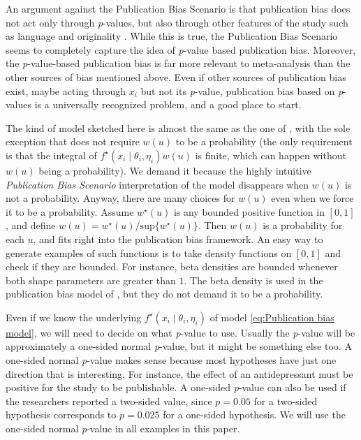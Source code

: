 \documentclass[preprint, authoryear]{elsarticle}
\theoremstyle{plain}
\theoremstyle{definition}
\begin{document}
An argument against the Publication Bias Scenario is that publication bias does not act only through \emph{p}-values, but also through other features of the study such as language \citep{egger1998meta}
and originality \citep{callaham1998positive}. While this is true, the Publication Bias Scenario seems to completely capture the idea of \emph{p}-value based publication bias. Moreover, the \emph{p}-value-based publication bias is far more relevant to meta-analysis than the other sources of bias mentioned above. Even if other sources of publication bias exist, maybe acting through $x_{i}$ but not its \emph{p}-value, publication bias based on \emph{p}-values is a universally recognized problem, and a good place to start.

The kind of model sketched here is almost the same as the one of \citet{hedges1992modeling}, with the sole exception that \citet{hedges1992modeling} does not require $w(u)$ to be a probability (the only requirement is that the integral of $f^{\star}\left(x_{i}\mid\theta_{i},\eta_{i}\right)w\left(u\right)$ is finite, which can happen without $w(u)$ being a probability). We demand it because the highly intuitive \emph{Publication Bias Scenario} interpretation of the model disappears when $w(u)$ is not a probability. Anyway, there are many choices for $w(u)$ even when we force it to be a probability. Assume $w^{\star}(u)$ is any bounded positive function in $\left[0,1\right]$, and define $w(u)=w^{\star}(u)/\textrm{sup}\{w^{\star}(u)\}$. Then $w\left(u\right)$ is a probability for each $u$, and fits right into the publication bias framework. An easy way to generate examples of such functions is to take density functions on $\left[0,1\right]$ and check if they are bounded. For instance, beta densities are bounded whenever both shape parameters are greater than $1$. The beta density is used in the publication bias model of \citet{citkowicz2017parsimonious}, but they do not demand it to be a probability.

Even if we know the underlying $f^{\star}\left(x_{i}\mid\theta_{i},\eta_{i}\right)$ of model \eqref{eq:Publication bias model}, we will need to decide on what \emph{p}-value to use. Usually the \emph{p}-value will be approximately a one-sided normal \emph{p}-value, but it might be something
else too. A one-sided normal \emph{p}-value makes sense because most hypotheses have just one direction that is interesting. For instance, the effect of an antidepressant must be positive for the study to be publishable. A one-sided \emph{p}-value can also be used if the researchers reported a two-sided value, since $p=0.05$ for a two-sided hypothesis corresponds to $p=0.025$ for a one-sided hypothesis. We will use the one-sided normal \emph{p}-value in all examples in this paper.
\end{document}
